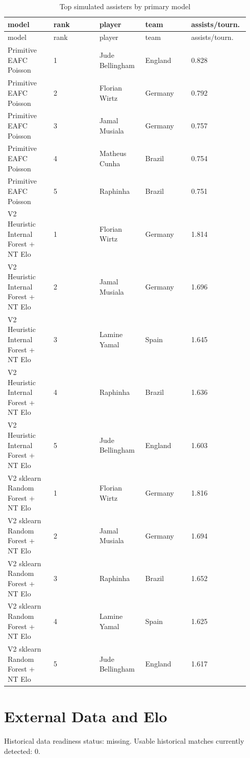 \documentclass[10pt]{article}
\begin{document}
\begin{longtable}{p{0.188\linewidth}p{0.188\linewidth}p{0.188\linewidth}p{0.188\linewidth}p{0.188\linewidth}}
\caption{Top simulated assisters by primary model}\\
\toprule
model & rank & player & team & assists/tourn. \\
\midrule
\endfirsthead
\toprule
model & rank & player & team & assists/tourn. \\
\midrule
\endhead
Primitive EAFC Poisson & 1 & Jude Bellingham & England & 0.828 \\
Primitive EAFC Poisson & 2 & Florian Wirtz & Germany & 0.792 \\
Primitive EAFC Poisson & 3 & Jamal Musiala & Germany & 0.757 \\
Primitive EAFC Poisson & 4 & Matheus Cunha & Brazil & 0.754 \\
Primitive EAFC Poisson & 5 & Raphinha & Brazil & 0.751 \\
V2 Heuristic Internal Forest + NT Elo & 1 & Florian Wirtz & Germany & 1.814 \\
V2 Heuristic Internal Forest + NT Elo & 2 & Jamal Musiala & Germany & 1.696 \\
V2 Heuristic Internal Forest + NT Elo & 3 & Lamine Yamal & Spain & 1.645 \\
V2 Heuristic Internal Forest + NT Elo & 4 & Raphinha & Brazil & 1.636 \\
V2 Heuristic Internal Forest + NT Elo & 5 & Jude Bellingham & England & 1.603 \\
V2 sklearn Random Forest + NT Elo & 1 & Florian Wirtz & Germany & 1.816 \\
V2 sklearn Random Forest + NT Elo & 2 & Jamal Musiala & Germany & 1.694 \\
V2 sklearn Random Forest + NT Elo & 3 & Raphinha & Brazil & 1.652 \\
V2 sklearn Random Forest + NT Elo & 4 & Lamine Yamal & Spain & 1.625 \\
V2 sklearn Random Forest + NT Elo & 5 & Jude Bellingham & England & 1.617 \\
\bottomrule
\end{longtable}


\section{External Data and Elo}

Historical data readiness status: missing. Usable historical matches currently detected: 0.
\end{document}
